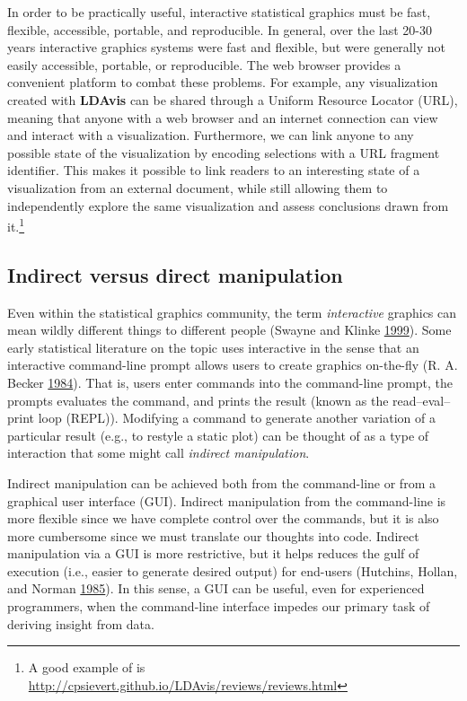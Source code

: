 \documentclass[12pt,]{isuthesis}
\let\rmarkdownfootnote\footnote%
\def\footnote{\protect\rmarkdownfootnote}
\begin{document}
In order to be practically useful, interactive statistical graphics must
be fast, flexible, accessible, portable, and reproducible. In general,
over the last 20-30 years interactive graphics systems were fast and
flexible, but were generally not easily accessible, portable, or
reproducible. The web browser provides a convenient platform to combat
these problems. For example, any visualization created with
\textbf{LDAvis} can be shared through a Uniform Resource Locator (URL),
meaning that anyone with a web browser and an internet connection can
view and interact with a visualization. Furthermore, we can link anyone
to any possible state of the visualization by encoding selections with a
URL fragment identifier. This makes it possible to link readers to an
interesting state of a visualization from an external document, while
still allowing them to independently explore the same visualization and
assess conclusions drawn from it.\footnote{A good example of is
  \url{http://cpsievert.github.io/LDAvis/reviews/reviews.html}}

\subsection{Indirect versus direct
manipulation}\label{indirect-versus-direct-manipulation}

Even within the statistical graphics community, the term
\emph{interactive} graphics can mean wildly different things to
different people (Swayne and Klinke
\protect\hyperlink{ref-swayne-klinke}{1999}). Some early statistical
literature on the topic uses interactive in the sense that an
interactive command-line prompt allows users to create graphics
on-the-fly (R. A. Becker \protect\hyperlink{ref-S:1984}{1984}). That is,
users enter commands into the command-line prompt, the prompts evaluates
the command, and prints the result (known as the read--eval--print loop
(REPL)). Modifying a command to generate another variation of a
particular result (e.g., to restyle a static plot) can be thought of as
a type of interaction that some might call \emph{indirect manipulation}.

Indirect manipulation can be achieved both from the command-line or from
a graphical user interface (GUI). Indirect manipulation from the
command-line is more flexible since we have complete control over the
commands, but it is also more cumbersome since we must translate our
thoughts into code. Indirect manipulation via a GUI is more restrictive,
but it helps reduces the gulf of execution (i.e., easier to generate
desired output) for end-users (Hutchins, Hollan, and Norman
\protect\hyperlink{ref-Hutchins:1985wu}{1985}). In this sense, a GUI can
be useful, even for experienced programmers, when the command-line
interface impedes our primary task of deriving insight from data.
\end{document}
